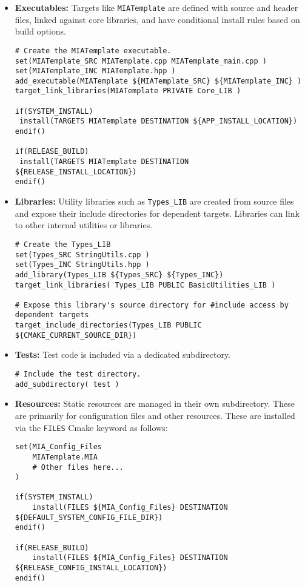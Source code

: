 \begin{itemize}
	\item \textbf{Executables:} Targets like \texttt{MIATemplate} are defined with source and header files, linked against core libraries, and have conditional install rules based on build options.
	\begin{lstlisting}[style=shellstyle]
# Create the MIATemplate executable.
set(MIATemplate_SRC MIATemplate.cpp MIATemplate_main.cpp )
set(MIATemplate_INC MIATemplate.hpp )
add_executable(MIATemplate ${MIATemplate_SRC} ${MIATemplate_INC} )
target_link_libraries(MIATemplate PRIVATE Core_LIB )

if(SYSTEM_INSTALL)
 install(TARGETS MIATemplate DESTINATION ${APP_INSTALL_LOCATION})
endif()

if(RELEASE_BUILD)
 install(TARGETS MIATemplate DESTINATION ${RELEASE_INSTALL_LOCATION})
endif()
	\end{lstlisting}
	\item \textbf{Libraries:} Utility libraries such as \texttt{Types\_LIB} are created from source files and expose their include directories for dependent targets. Libraries can link to other internal utilities or libraries.
	\begin{lstlisting}[style=shellstyle]
# Create the Types_LIB
set(Types_SRC StringUtils.cpp )
set(Types_INC StringUtils.hpp )
add_library(Types_LIB ${Types_SRC} ${Types_INC})
target_link_libraries( Types_LIB PUBLIC BasicUtilities_LIB )

# Expose this library's source directory for #include access by dependent targets
target_include_directories(Types_LIB PUBLIC ${CMAKE_CURRENT_SOURCE_DIR})
	\end{lstlisting}
	\item \textbf{Tests:} Test code is included via a dedicated subdirectory.
	\begin{lstlisting}[style=shellstyle]
# Include the test directory.
add_subdirectory( test )
	\end{lstlisting}
	\item \textbf{Resources:} Static resources are managed in their own subdirectory. These are primarily for configuration files and other resources. These are installed via the \texttt{FILES} Cmake keyword as follows:
	\begin{lstlisting}[style=shellstyle]
set(MIA_Config_Files
    MIATemplate.MIA
	# Other files here...
)

if(SYSTEM_INSTALL)
    install(FILES ${MIA_Config_Files} DESTINATION ${DEFAULT_SYSTEM_CONFIG_FILE_DIR})
endif()

if(RELEASE_BUILD)
    install(FILES ${MIA_Config_Files} DESTINATION ${RELEASE_CONFIG_INSTALL_LOCATION})
endif()
	\end{lstlisting}
\end{itemize}

